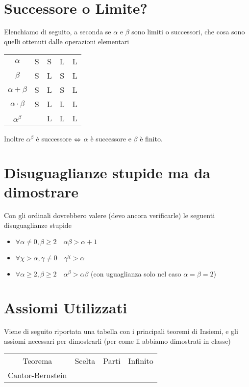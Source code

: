 \documentclass[a4paper,NoNotes,GeneralMath]{stdmdoc}
\begin{document}
	\section*{Successore o Limite?}
	Elenchiamo di seguito, a seconda se $\alpha$ e $\beta$ sono limiti o successori, che cosa sono quelli ottenuti dalle operazioni elementari
	\vskip 0.5cm \begin{tabular}{ccccc}
	$\alpha$             & S & S & L & L \\
	$\beta$              & S & L & S & L \\
	$\alpha + \beta$     & S & L & S & L \\
	$\alpha \cdot \beta$ & S & L & L & L \\
	$\alpha ^ \beta$     &   & L & L & L \\
	\end{tabular} \vskip 0.5cm
	Inoltre $\alpha^\beta$ è successore $\Leftrightarrow$ $\alpha$ è successore e $\beta$ è finito.
	
	\section*{Disuguaglianze stupide ma da dimostrare}
	Con gli ordinali dovrebbero valere (devo ancora verificarle) le seguenti disuguaglianze stupide
	\begin{itemize}
		\item $\forall \alpha \neq 0, \beta \ge 2 \quad \alpha \beta > \alpha + 1$
		\item $\forall \chi > \alpha, \gamma \neq 0 \quad \gamma^\chi > \alpha$
		\item $\forall \alpha \ge 2, \beta \ge 2 \quad \alpha^\beta > \alpha \beta$ (con uguaglianza solo nel caso $\alpha = \beta = 2$)
	\end{itemize}
	
	\section*{Assiomi Utilizzati}
	Viene di seguito riportata una tabella con i principali teoremi di Insiemi, e gli assiomi necessari per dimostrarli (per come li abbiamo dimostrati in classe)
	\vskip 0.5cm
	\begin{tabular}{cccc}
	Teorema                    & Scelta     & Parti      & Infinito   \\
	Cantor-Bernstein           & \crossmark & \crossmark & \checkmark \\
	\end{tabular} \vskip 0.5cm
	
\end{document}
